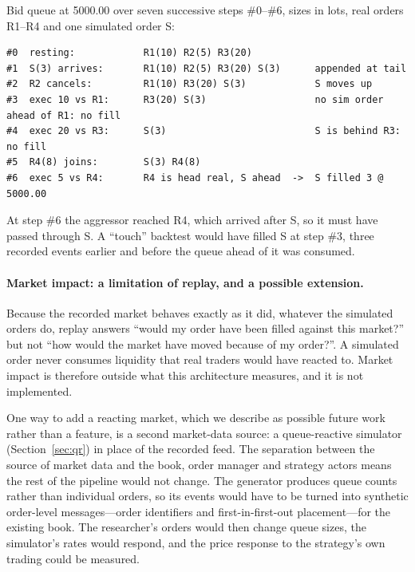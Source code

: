 \begin{example}
\label{ex:trace}
Bid queue at 5000.00 over seven successive steps \#0--\#6, sizes in lots, real orders R1--R4 and
one simulated order S:
\begin{lstlisting}
#0  resting:            R1(10) R2(5) R3(20)
#1  S(3) arrives:       R1(10) R2(5) R3(20) S(3)      appended at tail
#2  R2 cancels:         R1(10) R3(20) S(3)            S moves up
#3  exec 10 vs R1:      R3(20) S(3)                   no sim order ahead of R1: no fill
#4  exec 20 vs R3:      S(3)                          S is behind R3: no fill
#5  R4(8) joins:        S(3) R4(8)
#6  exec 5 vs R4:       R4 is head real, S ahead  ->  S filled 3 @ 5000.00
\end{lstlisting}
At step \#6 the aggressor reached R4, which arrived after S, so it must have passed through S. A
``touch'' backtest would have filled S at step \#3, three recorded events earlier and before the
queue ahead of it was consumed.
\end{example}

\paragraph{Market impact: a limitation of replay, and a possible extension.} Because the recorded
market behaves exactly as it did, whatever the simulated orders do, replay answers ``would my order have
been filled against this market?'' but not ``how would the market have moved because of my order?''. A
simulated order never consumes liquidity that real traders would have reacted to. Market impact is
therefore outside what this architecture measures, and it is not implemented.

One way to add a reacting market, which we describe as possible future work rather than a feature, is a
second market-data source: a queue-reactive simulator (Section~\ref{sec:qr}) in place of the recorded feed.
The separation between the source of market data and the book, order manager and strategy actors means
the rest of the pipeline would not change. The generator produces queue counts rather than individual
orders, so its events would have to be turned into synthetic order-level messages---order identifiers and
first-in-first-out placement---for the existing book. The researcher's orders would then change queue
sizes, the simulator's rates would respond, and the price response to the strategy's own trading could be
measured.

